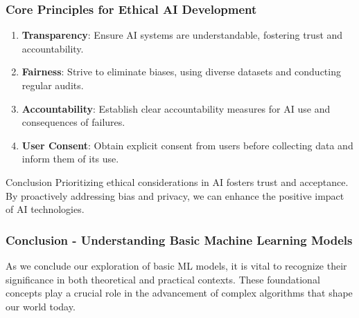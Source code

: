 \documentclass[aspectratio=169]{beamer}
\begin{document}
\begin{frame}[fragile]
    \frametitle{Core Principles for Ethical AI Development}
    \begin{enumerate}
        \item \textbf{Transparency}: Ensure AI systems are understandable, fostering trust and accountability.
        \item \textbf{Fairness}: Strive to eliminate biases, using diverse datasets and conducting regular audits.
        \item \textbf{Accountability}: Establish clear accountability measures for AI use and consequences of failures.
        \item \textbf{User Consent}: Obtain explicit consent from users before collecting data and inform them of its use.
    \end{enumerate}

    \begin{block}{Conclusion}
        Prioritizing ethical considerations in AI fosters trust and acceptance. By proactively addressing bias and privacy, we can enhance the positive impact of AI technologies.
    \end{block}
\end{frame}

\begin{frame}[fragile]
    \frametitle{Conclusion - Understanding Basic Machine Learning Models}
    As we conclude our exploration of basic ML models, it is vital to recognize their significance in both theoretical and practical contexts. These foundational concepts play a crucial role in the advancement of complex algorithms that shape our world today.
\end{frame}
\end{document}

